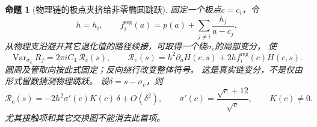 \documentclass[11pt,a4paper]{ctexart}
\theoremstyle{cnplain}\newtheorem{theorem}{定理}[section]
\newtheorem{proposition}[theorem]{命题}
\theoremstyle{definition}\newtheorem{definition}[theorem]{定义}
\theoremstyle{remark}\newtheorem{remark}[theorem]{注}
\begin{document}
\begin{proposition}[物理链的极点夹挤给非零椭圆跳跃]\label{prop:exchangepinch}
固定一个极点$c=c_i$，令
\[
 h=h_i,\qquad f_i^{\mathrm{reg}}(a)=
 p(a)+\sum_{j\ne i}\frac{h_j}{a-c_j}.
\]
从物理支沿避开其它退化值的路径续接，可取得一个绕$\sigma_c$的局部变分，
使
\begin{equation}\label{eq:exchangedisc}
 \operatorname{Var}_{\sigma_c}R_f
 =2\pi i C_4\,\mathcal R_c(s),\qquad
 \mathcal R_c(s)=h^2\partial_aH(c,s)
              +2h f_i^{\mathrm{reg}}(c)H(c,s).
\end{equation}
圆周及管取向按此式固定；反向绕行改变整体符号。
这是真实链变分，不是仅由形式留数猜测物理跳跃。
设$\delta=s-\sigma_c$，则
\begin{equation}\label{eq:exchangereslead}
 \mathcal R_c(s)=-2h^2\sigma'(c)K(c)\,\delta+O(\delta^2),
 \qquad \sigma'(c)=\frac{\sqrt c+12}{\sqrt c},\qquad K(c)\ne0 .
\end{equation}
尤其接触项和其它交换图不能消去此首项。
\end{proposition}
\end{document}
